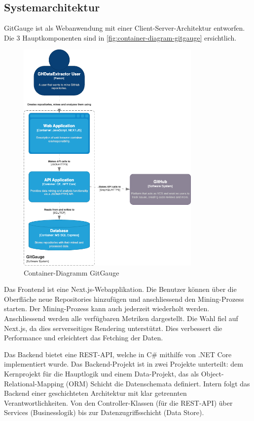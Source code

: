 \subsection{Systemarchitektur}
GitGauge ist als Webanwendung mit einer Client-Server-Architektur entworfen. Die 3 Hauptkomponenten sind in \autoref{fig:container-diagram-gitgauge} ersichtlich. 
\begin{figure}[htbp]
    \centering
        \includegraphics[width=0.8\textwidth]{Figures/container-diagram-gitgauge.png}
    \caption{Container-Diagramm GitGauge \parencite{grand_joel_vt1_joelgrand_repository_2024}}
    \label{fig:container-diagram-gitgauge}
\end{figure}

Das Frontend ist eine Next.js-Webapplikation. Die Benutzer können über die Oberfläche neue Repositories hinzufügen und anschliessend den Mining-Prozess starten. Der Mining-Prozess kann auch jederzeit wiederholt werden. Anschliessend werden alle verfügbaren Metriken dargestellt. Die Wahl fiel auf Next.js, da dies serverseitiges Rendering unterstützt. Dies verbessert die Performance und erleichtert das Fetching der Daten. \parencite{grand_joel_vt1_joelgrand_repository_2024}

Das Backend bietet eine REST-API, welche in C\# mithilfe von .NET Core implementiert wurde. Das Backend-Projekt ist in zwei Projekte unterteilt: dem Kernprojekt für die Hauptlogik und einem Data-Projekt, das als Object-Relational-Mapping (ORM) Schicht die Datenschemata definiert. Intern folgt das Backend einer geschichteten Architektur mit klar getrennten Verantwortlichkeiten. Von den Controller-Klassen (für die REST-API) über Services (Businesslogik) bis zur Datenzugriffsschicht (Data Store). \parencite{grand_joel_vt1_joelgrand_repository_2024}

